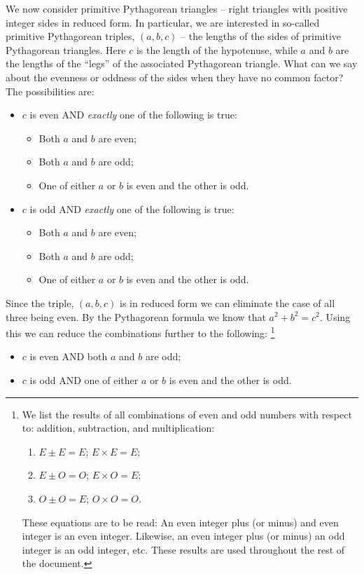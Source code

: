 \documentclass[12pt]{article}
\begin{document}
We now consider primitive Pythagorean triangles -- right 
triangles with positive integer sides in reduced form.
In particular, we are interested in so-called primitive Pythagorean triples,
$(a,b,c)$ -- the lengths of the sides of primitive Pythagorean triangles.
Here $c$ is the length of the hypotenuse, while $a$ and $b$ are 
the lengths of the ``legs'' of the associated Pythagorean triangle.
\eject
What can we say about the evenness or oddness of the sides when they have no 
common factor? The possibilities are: 
\begin{itemize}
    \item{$c$ is even AND {\em exactly\/} one of the following is true:}
        \begin{itemize}
            \item{Both $a$ and $b$ are even;}
            \item{Both $a$ and $b$ are odd;}
            \item{One of either $a$ or $b$ is even and the other is odd.}
        \end{itemize}
    \item{$c$ is odd AND {\em exactly\/} one of the following is true:}
        \begin{itemize}
            \item{Both $a$ and $b$ are even;}
            \item{Both $a$ and $b$ are odd;}
            \item{One of either $a$ or $b$ is even and the other is odd.}
        \end{itemize}
\end{itemize}
Since the triple, $(a,b,c)$ is in reduced form we can eliminate the case 
of all three being even.
By the Pythagorean formula we know that $a^2 + b^2 = c^2$. Using this we can 
reduce the combinations further to the following:%
\footnote{We list the results of all combinations of even and odd numbers with 
respect to: addition, subtraction, and multiplication:
\begin{enumerate}
    \item{$E \pm E = E$; $ E \times E = E$;}
    \item{$E \pm O = O$; $ E \times O = E$;}
    \item{$O \pm O = E$; $ O \times O = O$.}
\end{enumerate}
These equations are to be read: An even integer plus (or minus) and even integer 
is an even integer.
Likewise, an even integer plus (or minus) an odd integer is an odd integer, etc.
These results are used throughout the rest of the document.
}
\begin{itemize}
  \item{$c$ is even AND both $a$ and $b$ are odd;}
  \item{$c$ is odd AND one of either $a$ or $b$ is even and the other is odd.}
\end{itemize}
\end{document}
